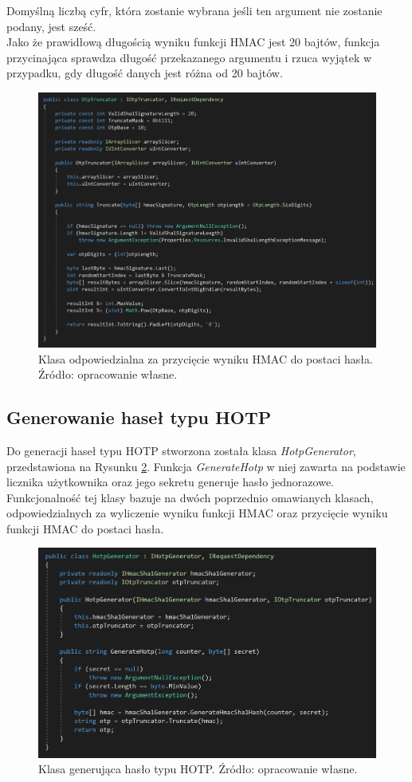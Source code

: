 Domyślną liczbą cyfr, która zostanie wybrana jeśli ten argument nie zostanie podany, jest sześć. \\
Jako że prawidłową długością wyniku funkcji HMAC jest 20 bajtów, funkcja przycinająca sprawdza 
długość przekazanego argumentu i rzuca wyjątek w przypadku, gdy długość danych jest różna od 20 bajtów.
\begin{figure}[t]
    \centering
	\includegraphics[width=\textwidth]{content/images/code-truncator}
    \caption{Klasa odpowiedzialna za przycięcie wyniku HMAC do postaci hasła. Źródło: opracowanie własne.}
    \label{code-truncator}
\end{figure}

\subsection{Generowanie haseł typu HOTP}
Do generacji haseł typu HOTP stworzona została klasa \textit{HotpGenerator}, przedstawiona na Rysunku \ref{code-hotp}.
Funkcja \textit{GenerateHotp} w niej zawarta na podstawie licznika użytkownika oraz jego sekretu generuje hasło jednorazowe.
Funkcjonalność tej klasy bazuje na dwóch poprzednio omawianych klasach, odpowiedzialnych za wyliczenie wyniku funkcji HMAC oraz 
przycięcie wyniku funkcji HMAC do postaci hasła.
\begin{figure}[t]
    \centering
	\includegraphics[width=\textwidth]{content/images/code-hotpgenerator}
    \caption{Klasa generująca hasło typu HOTP. Źródło: opracowanie własne.}
    \label{code-hotp}
\end{figure}

